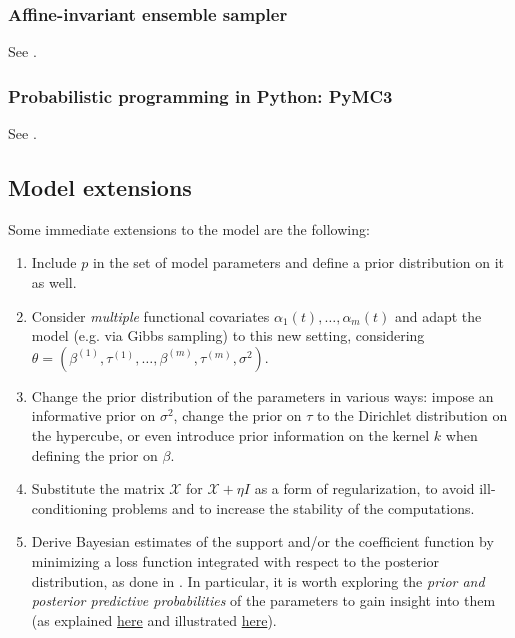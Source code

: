 \documentclass[
  a4paper,
	fontsize=11pt, %
	twoside=false, %
  secnumdepth=2,
	numbers=noenddot, %
]{kaohandt}
\begin{document}
\subsubsection{Affine-invariant ensemble sampler}

See .

\subsubsection{Probabilistic programming in Python: PyMC3}

See .

\subsection{Model extensions}

Some immediate extensions to the model are the following:
\begin{enumerate}

  \item Include \(p\) in the set of model parameters and define a prior distribution on it as well.

  \item Consider \textit{multiple} functional covariates \(\alpha_1(t), \dots, \alpha_m(t)\) and adapt the model (e.g. via Gibbs sampling) to this new setting, considering \(\theta=(\beta^{(1)}, \tau^{(1)}, \dots, \beta^{(m)}, \tau^{(m)}, \sigma^2)\).

  \item Change the prior distribution of the parameters in various ways: impose an informative prior on \(\sigma^2\), change the prior on \(\tau\) to the Dirichlet distribution on the hypercube, or even introduce prior information on the kernel \(k\) when defining the prior on \(\beta\).

  \item Substitute the matrix \(\mathcal X\) for \(\mathcal X + \eta I\) as a form of regularization, to avoid ill-conditioning problems and to increase the stability of the computations.

  \item Derive Bayesian estimates of the support and/or the coefficient function by minimizing a loss function integrated with respect to the posterior distribution, as done in . In particular, it is worth exploring the \textit{prior and posterior predictive probabilities} of the parameters to gain insight into them (as explained \href{https://en.wikipedia.org/wiki/Bayesian_inference#Bayesian_prediction}{here} and illustrated \href{https://docs.pymc.io/en/stable/pymc-examples/examples/diagnostics_and_criticism/posterior_predictive.html}{here}).

\end{enumerate}
\end{document}
